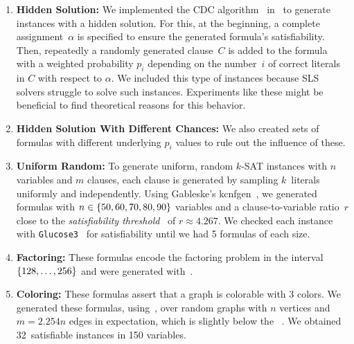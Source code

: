 \begin{enumerate}
	\item \textbf{\textcolor{lipicsGray}{Hidden Solution:}}		
	We implemented the CDC algorithm~\cite{BC18UsingAlgorithmConfigurationTools, BHLRTWZ02Hiding} in~\cite{LW21SourceCodeOfConcealSATgen}
	to generate instances with a hidden solution. 
	For this, 
	at the beginning,
	a complete assignment~$\alpha$ is specified to ensure the generated formula's satisfiability.
	Then, repeatedly a randomly generated clause~$C$ is added to the formula with a weighted probability $p_i$ depending on the number~$i$ of correct literals in $C$ with respect to $\alpha$. 
	We included this type of instances because SLS solvers struggle to solve such instances. Experiments like these might be beneficial to find theoretical reasons for this behavior.	
	
	\item \textbf{\textcolor{lipicsGray}{Hidden Solution With Different Chances:}}			
	We also created sets of formulas with different underlying $p_i$ values to rule out the influence of these.
	
	
	\item \textbf{\textcolor{lipicsGray}{Uniform Random:}}	
	To generate
	uniform, random $k$-SAT instances with $n$ variables and $m$ clauses, each
	clause is generated by sampling $k$~literals uniformly and independently. 
	Using Gableske's kcnfgen~\cite{kcnfgen},
	we generated formulas with $n \in \{ 50,60,70,80,90 \}$ variables and
	a clause-to-variable ratio~$r$ close to the \emph{satisfiability threshold}~\cite{MMZ06ThresholdValues} of $r \approx 4.267$.
	We checked each instance 
	with \texttt{Glucose3}~\cite{AS09Glucose,ES03MiniSat}
	for satisfiability
	until we had 5 formulas of each size.		
	
	
	\item \textbf{\textcolor{lipicsGray}{Factoring:}} 
	These formulas encode the factoring problem in the interval $\{ 128, \dots, 256 \}$ and were generated with~\cite{Diemer21GenFactorSat}.
	
	
	\item \textbf{\textcolor{lipicsGray}{Coloring:}}
	These formulas assert that a 
	graph 
	is colorable with 
	3 colors.
	We generated 
	these formulas, 
	using~\cite{LENV17CNFgen}, over random graphs with $n$ vertices and $m = 2.254n$ edges in expectation,
	which is slightly below the ~\cite{KaporisKS00}.
	We
	obtained 32~satisfiable instances in 150 variables.
	
	
\end{enumerate}



